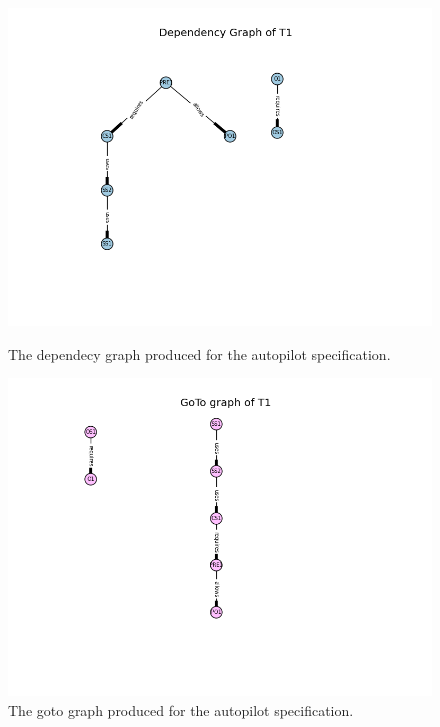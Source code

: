 \begin{figure}[H]
\centering
\begin{minipage}{0.45\textwidth}
\centering
\includegraphics[scale=0.5]{examples/semiform/25a.png}
\vspace{-0.18in}
\caption{The dependecy graph produced for the autopilot specification. \label{fig:autodepgraph}}
\vspace{-0.2in}
\end{minipage}\hfill
\begin{minipage}{0.43\textwidth}
\centering
\includegraphics[scale=0.5]{examples/semiform/25b.png}
\vspace{-0.2in}
\caption{The goto graph produced for the autopilot specification. \label{fig:autogotograph}}
\vspace{-0.2in}
\end{minipage}
\end{figure}

